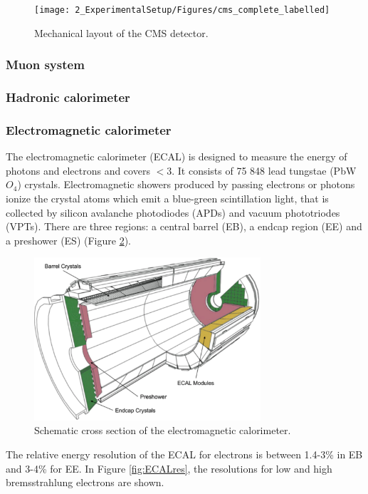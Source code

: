 \begin{figure}[ht]
   \centering
	\texttt{[image: 2\_ExperimentalSetup/Figures/cms\_complete\_labelled]}
	\caption{Mechanical layout of the CMS detector\cite{CMSdraw}.}
	\label{fig:CMS}
\end{figure}

	\subsubsection{Muon system}
	\subsubsection{Hadronic calorimeter}	
\subsubsection{Electromagnetic calorimeter}
The electromagnetic calorimeter (ECAL) is designed to measure the energy of photons and electrons and covers \abspsrap $<3$. It consists of 75 848 lead tungstae (PbW$O_4$) crystals. Electromagnetic showers produced by passing electrons or photons ionize the crystal atoms which emit a blue-green scintillation light, that is collected by silicon avalanche photodiodes (APDs) and vacuum phototriodes (VPTs). There are three regions: a central barrel (EB), a endcap region (EE) and a preshower (ES) (Figure \ref{fig:ECAL}). 
\begin{figure}[ht]
	\centering
	\includegraphics[width=0.75\textwidth]{2_ExperimentalSetup/Figures/imageedit_5_8264930617}
	\caption{Schematic cross section of the electromagnetic calorimeter\cite{Chatrchyan:2008aa}.}
	\label{fig:ECAL}
\end{figure}
The relative energy resolution of the ECAL for electrons is between 1.4-3\% in EB and 3-4\% for EE. In Figure \ref{fig:ECALres}, the resolutions for low and high bremsstrahlung electrons are shown. 

